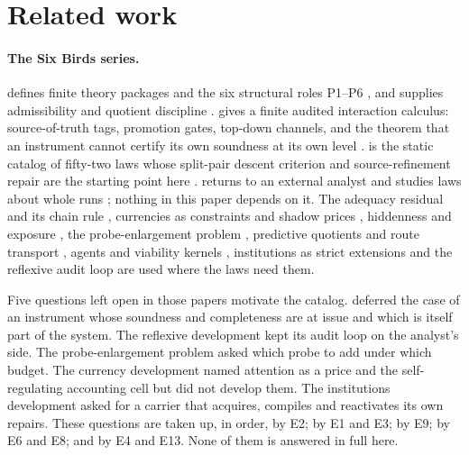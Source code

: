 \section{Related work}\label{sec:related}

\paragraph{The Six Birds series.} \FoundI{} defines finite theory packages and the six structural
roles P1--P6 \citep{Tsiokos2026FoundI}, and \FoundII{} supplies admissibility and quotient discipline
\citep{Tsiokos2026FoundII}. \FoundIII{} gives a finite audited interaction calculus: source-of-truth
tags, promotion gates, top-down channels, and the theorem that an instrument cannot certify its own
soundness at its own level \citep{Tsiokos2026FoundIII}. \FoundIV{} is the static catalog of
fifty-two laws whose split-pair descent criterion and source-refinement repair are the starting
point here \citep{Tsiokos2026FoundIV}. \FoundVI{} returns to an external analyst and studies laws
about whole runs \citep{Tsiokos2026FoundVI}; nothing in this paper depends on it. The adequacy
residual and its chain rule \citep{Tsiokos2026Adequacy}, currencies as constraints and shadow
prices \citep{Tsiokos2026Currency}, hiddenness and exposure \citep{Tsiokos2026Hiddenness}, the
probe-enlargement problem \citep{Tsiokos2026NeedleKiller}, predictive quotients and route
transport \citep{Tsiokos2026Holonomy}, agents and viability kernels \citep{Tsiokos2026Agents},
institutions as strict extensions \citep{Tsiokos2026Institutions} and the reflexive audit loop
\citep{Tsiokos2026Reflexive} are used where the laws need them.

Five questions left open in those papers motivate the catalog. \FoundII{} deferred the case of an
instrument whose soundness and completeness are at issue and which is itself part of the system.
The reflexive development kept its audit loop on the analyst's side. The probe-enlargement problem
asked which probe to add under which budget. The currency development named attention as a price
and the self-regulating accounting cell but did not develop them. The institutions development
asked for a carrier that acquires, compiles and reactivates its own repairs. These questions are
taken up, in order, by E2; by E1 and E3; by E9; by E6 and E8; and by E4 and E13. None of them is
answered in full here.

